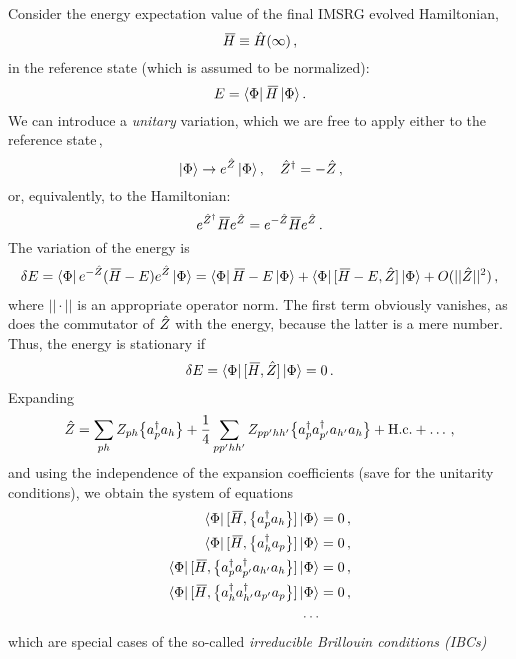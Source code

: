 Consider the energy expectation value of the final IMSRG evolved Hamiltonian, 
\begin{equation}
  \mkern 3mu\overline{\mkern-3muH} \equiv \hat{H}(\infty)\,,
\end{equation}
in the reference state (which is assumed to be normalized):
\begin{equation}
  E = \langle{\Phi}|\,{\mkern 3mu\overline{\mkern-3muH}}\,|{\Phi}\rangle\,.
\end{equation}
We can introduce a \emph{unitary} variation, which we are free to apply 
either to the reference state\,,
\begin{equation}
  \,|{\Phi}\rangle\rightarrow e^{\hat{Z}}\,|{\Phi}\rangle\,,\quad\hat{Z}^\dag=-\hat{Z}\,,
\end{equation}
or, equivalently, to the Hamiltonian:
\begin{equation}
  e^{\hat{Z}^\dag}\mkern 3mu\overline{\mkern-3muH} e^{\hat{Z}} = e^{-\hat{Z}}\mkern 3mu\overline{\mkern-3muH} e^{\hat{Z}}\,.
\end{equation}
The variation of the energy is
\begin{align}
  \delta E = \langle{\Phi}|\,{e^{-\hat{Z}}(\mkern 3mu\overline{\mkern-3muH} - E) e^{\hat{Z}}}\,|{\Phi}\rangle 
           = \langle{\Phi}|\,{\mkern 3mu\overline{\mkern-3muH}-E}\,|{\Phi}\rangle + \langle{\Phi}|\,{[{\mkern 3mu\overline{\mkern-3muH}-E},{\hat{Z}}]}\,|{\Phi}\rangle + O(||\hat{Z}||^2)\,,
\end{align}
where $||\cdot||$ is an appropriate operator norm. The first term obviously 
vanishes, as does the commutator of $\hat{Z}$ with the energy, because the latter
is a mere number. Thus, the energy is stationary if
\begin{equation}
  \delta E = \langle{\Phi}|\,{[{\mkern 3mu\overline{\mkern-3muH}},{\hat{Z}}]}\,|{\Phi}\rangle = 0\,. 
\end{equation}
Expanding 
\begin{equation}
  \hat{Z} =\sum_{ph} Z_{ph}\big\{a^\dag_{p}a_{h}\big\} + \frac{1}{4}\sum_{pp'hh'} Z_{pp'hh'}\big\{a^\dag_{p}a^\dag_{p'}a_{h'}a_{h}\big\} 
        + \text{H.c.} + \ldots\,,
\end{equation}
and using the independence of the expansion coefficients (save for the unitarity
conditions), we obtain the system of equations
\begin{align}
  \langle{\Phi}|\,{[{\mkern 3mu\overline{\mkern-3muH}},{\big\{a^\dag_{p}a_{h}\big\}}]}\,|{\Phi}\rangle &= 0 \,,\\
  \langle{\Phi}|\,{[{\mkern 3mu\overline{\mkern-3muH}},{\big\{a^\dag_{h}a_{p}\big\}}]}\,|{\Phi}\rangle &= 0 \,,\\
  \langle{\Phi}|\,{[{\mkern 3mu\overline{\mkern-3muH}},{\big\{a^\dag_{p}a^\dag_{p'}a_{h'}a_{h}\big\}}]}\,|{\Phi}\rangle &= 0 \,,\\
  \langle{\Phi}|\,{[{\mkern 3mu\overline{\mkern-3muH}},{\big\{a^\dag_{h}a^\dag_{h'}a_{p'}a_{p}\big\}}]}\,|{\Phi}\rangle &= 0 \,,\\
  \ldots\notag
\end{align}
which are special cases of the so-called \emph{irreducible Brillouin conditions (IBCs)}
